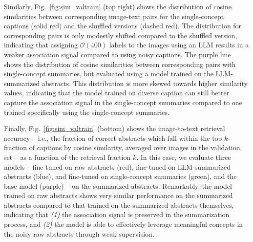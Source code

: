 \documentclass[10pt]{article} %
\begin{document}
Similarly, Fig.~\ref{fig:sim_valtrain} (top right) shows the distribution of cosine similarities between corresponding image-text pairs for the single-concept captions (solid red) and the shuffled versions (dashed red).
%
The distribution for corresponding pairs is only modestly shifted compared to the shuffled version, indicating that assigning $\mathcal O(400)$ labels to the images using an LLM results in a weaker association signal compared to using noisy captions.
%
The purple line shows the distribution of cosine similarities between corresponding pairs with single-concept summaries, but evaluated using a model trained on the LLM-summarized abstracts.
%
This distribution is more skewed towards higher similarity values, indicating that the model trained on diverse caption can still better capture the association signal in the single-concept summaries compared to one trained specifically using the single-concept summaries.

Finally, Fig.~\ref{fig:sim_valtrain} (bottom) shows the image-to-text retrieval accuracy -- i.e., the fraction of correct abstracts which fall within the top $k$-fraction of captions by cosine similarity, averaged over images in the validation set -- as a function of the retrieval fraction $k$.
%
In this case, we evaluate three models -- fine tuned on raw abstracts (red), fine-tuned on LLM-summarized abstracts (blue), and fine-tuned on single-concept summaries (green), and the base model (purple) -- on the summarized abstracts.
%
Remarkably, the model trained on raw abstracts shows very similar performance on the summarized abstracts compared to that trained on the summarized abstracts themselves, indicating that \emph{(1)} the association signal is preserved in the summarization process, and \emph{(2)} the model is able to effectively leverage meaningful concepts in the noisy raw abstracts through weak supervision.
\end{document}
